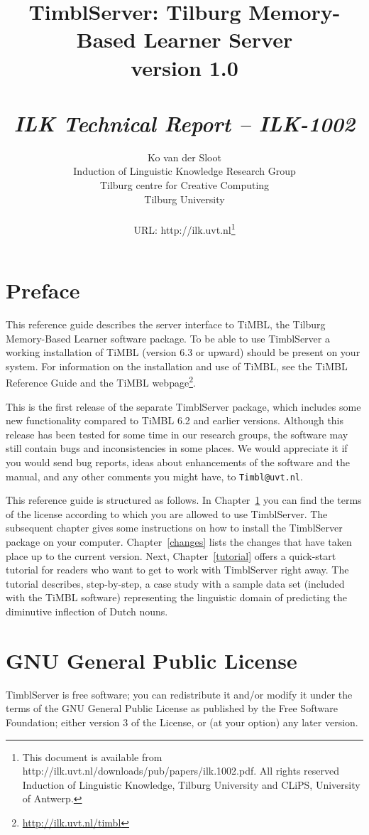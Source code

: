 \documentclass{report}
\author{Ko van der Sloot \\
	Induction of Linguistic Knowledge Research Group\\
	Tilburg centre for Creative Computing\\
        Tilburg University \\ \\
       URL: http://ilk.uvt.nl\thanks{This document is available from
	http://ilk.uvt.nl/downloads/pub/papers/ilk.1002.pdf. All rights reserved
	Induction of Linguistic Knowledge, Tilburg University and 
        CLiPS, University of Antwerp.}}
\title{{\huge TimblServer: Tilburg Memory-Based Learner Server} \\ \vspace*{0.5cm}
{\bf version 1.0} \\ \vspace*{0.5cm}{\huge Manual}\\
\vspace*{1cm} {\it ILK Technical Report -- ILK-1002}}
\begin{document}

\maketitle

\tableofcontents

\chapter*{Preface}

This reference guide describes the server interface to TiMBL, the
Tilburg Memory-Based Learner software package. To be able to use
TimblServer a working installation of TiMBL (version 6.3 or upward)
should be present on your system. For information on the installation
and use of TiMBL, see the TiMBL Reference Guide \cite{Daelemans+10}
and the TiMBL webpage\footnote{\url{http://ilk.uvt.nl/timbl}}.

This is the first release of the separate TimblServer package, which
includes some new functionality compared to TiMBL 6.2 and earlier
versions.  Although this release has been tested for some time in our
research groups, the software may still contain bugs and
inconsistencies in some places. We would appreciate it if you would
send bug reports, ideas about enhancements of the software and the
manual, and any other comments you might have, to {\tt Timbl@uvt.nl}.

This reference guide is structured as follows. In
Chapter~\ref{license} you can find the terms of the license according
to which you are allowed to use TimblServer. The subsequent chapter gives
some instructions on how to install the TimblServer package on your
computer. Chapter~\ref{changes} lists the changes that have taken
place up to the current version. Next, Chapter~\ref{tutorial} offers a
quick-start tutorial for readers who want to get to work with TimblServer
right away. The tutorial describes, step-by-step, a case study with a
sample data set (included with the TiMBL software) representing the
linguistic domain of predicting the diminutive inflection of Dutch
nouns. 

\chapter{GNU General Public License}
\label{license}

TimblServer is free software; you can redistribute it and/or modify it under the terms of the GNU General Public License as published by the Free Software Foundation; either version 3 of the License, or (at your option) any later version.
\end{document}
